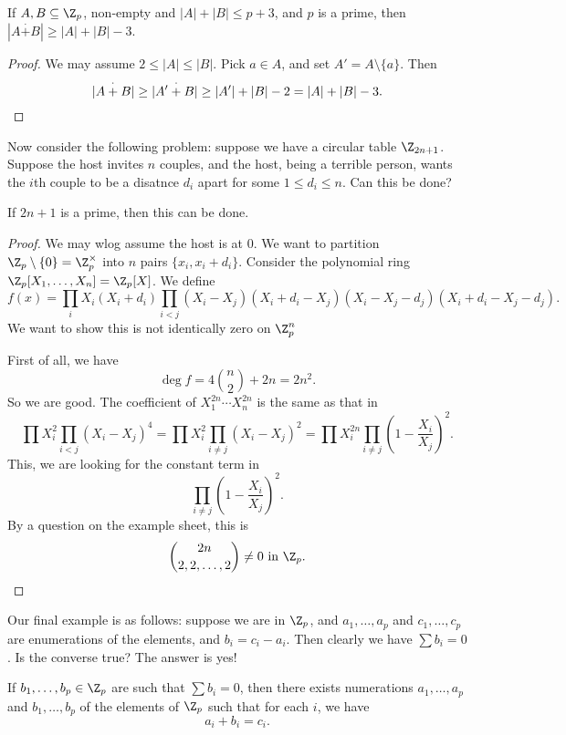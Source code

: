 \documentclass[a4paper]{article}
\begin{document}
\begin{cor}
  If $A, B \subseteq \Z_p$, non-empty and $|A| + |B| \leq p + 3$, and $p$ is a prime, then $|A \overset{\cdot}{+} B| \geq |A| + |B| - 3$.
\end{cor}

\begin{proof}
  We may assume $2 \leq |A| \leq |B|$. Pick $a \in A$, and set $A' = A \setminus \{a\}$. Then
  \[
    |A \overset{\cdot}{+} B| \geq |A' \overset{\cdot}{+} B| \geq |A'| + |B| - 2 = |A| + |B| - 3.\qedhere
  \]
\end{proof}

Now consider the following problem: suppose we have a circular table $\Z_{2n + 1}$. Suppose the host invites $n$ couples, and the host, being a terrible person, wants the $i$th couple to be a disatnce $d_i$ apart for some $1 \leq d_i \leq n$. Can this be done?

\begin{thm}
  If $2n + 1$ is a prime, then this can be done.
\end{thm}

\begin{proof}
  We may wlog assume the host is at $0$. We want to partition $\Z_p \setminus \{0\} = \Z_p^\times$ into $n$ pairs $\{x_i, x_i + d_i\}$. Consider the polynomial ring $\Z_p[X_1, \ldots, X_n] = \Z_p[X]$. We define
  \[
    f(x) = \prod_i X_i (X_i + d_i) \prod_{i < j} (X_i - X_j)(X_i + d_i - X_j) (X_i - X_j - d_j)(X_i + d_i - X_j - d_j).
  \]
  We want to show this is not identically zero on $\Z_p^n$

  First of all, we have
  \[
    \deg f = 4 \binom{n}{2}  + 2n = 2n^2.
  \]
  So we are good. The coefficient of $X_1^{2n} \cdots X_n^{2n}$ is the same as that in
  \[
    \prod X_i^2 \prod_{i < j} (X_i - X_j)^4 = \prod X_i^2 \prod_{i \not= j} (X_i - X_j)^2 = \prod X_i^{2n} \prod_{i \not= j} \left(1 - \frac{X_i}{X_j}\right)^2.
  \]
  This, we are looking for the constant term in
  \[
    \prod_{i \not= j} \left(1 - \frac{X_i}{ X_j}\right)^2.
  \]
  By a question on the example sheet, this is
  \[
    \binom{2n}{2,2,\ldots, 2} \not= 0\text{ in }\Z_p.\qedhere
  \]
\end{proof}

Our final example is as follows: suppose we are in $\Z_p$, and $a_1, \ldots, a_p$ and $c_1, \ldots, c_p$ are enumerations of the elements, and $b_i = c_i - a_i$. Then clearly we have $\sum b_i = 0$. Is the converse true? The answer is yes!
\begin{thm}
  If $b_1, \ldots, b_p \in \Z_p$ are such that $\sum b_i = 0$, then there exists numerations $a_1, \ldots, a_p$ and $b_1, \ldots, b_p$ of the elements of $\Z_p$ such that for each $i$, we have
  \[
    a_i + b_i = c_i.
  \]
\end{thm}
\end{document}
